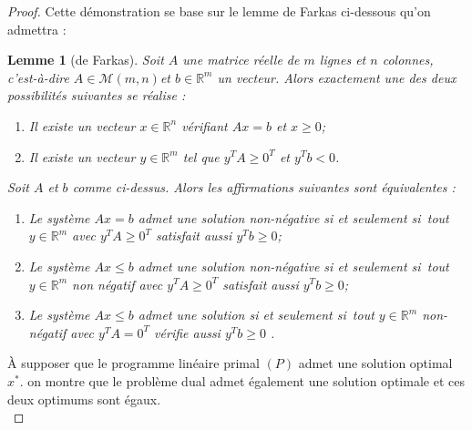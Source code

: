 \documentclass[11pt]{report}
\newenvironment{boxtheorem}
{\begin{tcolorbox}
		[enhanced jigsaw,breakable,pad at break*=2mm,
		colback=black!5,colframe=bleueLeger]}
	{\end{tcolorbox}}
\theoremstyle{styletheorem}
\newtheorem{lemma}[theoreme]{Lemme}
\theoremstyle{styledef}
\theoremstyle{remark}
\newenvironment{lemme}
{\vspace*{0.3cm}\begin{boxtheorem}\begin{lemma}}{\end{lemma}\end{boxtheorem}\vspace*{0.3cm}}
\newcommand{\ie}{c'est-à-dire }
\newcommand{\ssi}{si et seulement si\  }
\newcommand{\R}{\ensuremath{\mathbb{R}}}
\begin{document}
\begin{proof}
	Cette démonstration se base sur le lemme de Farkas ci-dessous  qu'on admettra : 
	\begin{lemme}[de Farkas]\label{lemFar}
		Soit $A$ une matrice réelle de $m$ lignes et $n$ colonnes, \ie $A \in \mathcal{M}(m,n)$et $b \in \R^m$ un vecteur. Alors exactement une des deux possibilités suivantes se réalise :
		\begin{enumerate}[label = (F\Roman*)]
			\item Il existe un vecteur $x\in \R^n$ vérifiant $Ax =b$ et $x \geq 0$;
			\item Il existe un vecteur $y \in \R^m$ tel que $y^T A \geq 0^T$ et $y^Tb <0$.
		\end{enumerate}
		Soit $A$ et $b$ comme ci-dessus. Alors les affirmations suivantes sont équivalentes :
		\begin{enumerate}[label= ($\roman*$)]
			\item Le système $Ax=b$ admet une solution non-négative \ssi tout $y\in \R^m$ avec $y^TA \geq 0^T$ satisfait aussi $y^Tb \geq0$;
			\item Le système $Ax\leq b$ admet une solution non-négative \ssi tout $y\in \R^m$ non négatif avec $y^T A\geq 0^T$ satisfait aussi $y^Tb \geq 0$;
			\item Le système $Ax\leq b$ admet une solution \ssi tout $y \in \R^m$ non-négatif avec $y^T A = 0^T$ vérifie aussi $y^Tb \geq 0$  \cite{b1}. 
		\end{enumerate}
		
	\end{lemme}
	À supposer que le programme linéaire primal $(P)$ admet une solution optimal $x^*$. on montre que le problème dual admet également une solution optimale et ces deux optimums sont égaux.\\
	

\end{proof}
\end{document}
